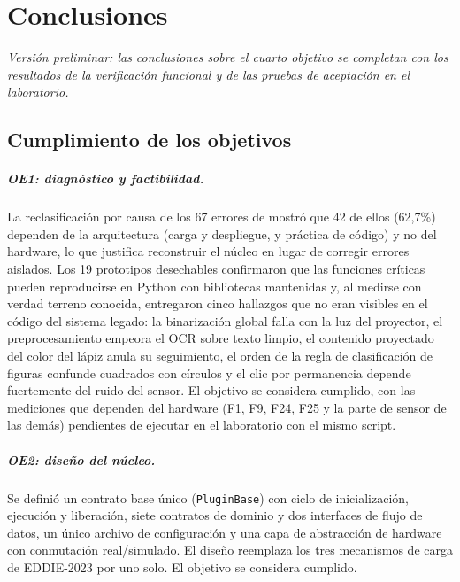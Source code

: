 \chapter{Conclusiones}
\label{cap:conclusiones}

\textit{Versión preliminar: las conclusiones sobre el cuarto objetivo se completan con los resultados de la verificación funcional y de las pruebas de aceptación en el laboratorio.}

\section{Cumplimiento de los objetivos}

\paragraph{OE1: diagnóstico y factibilidad.} La reclasificación por causa de los 67 errores de \citet{ibaceta2023} mostró que 42 de ellos (62,7\%) dependen de la arquitectura (carga y despliegue, y práctica de código) y no del hardware, lo que justifica reconstruir el núcleo en lugar de corregir errores aislados. Los 19 prototipos desechables confirmaron que las funciones críticas pueden reproducirse en Python con bibliotecas mantenidas y, al medirse con verdad terreno conocida, entregaron cinco hallazgos que no eran visibles en el código del sistema legado: la binarización global falla con la luz del proyector, el preprocesamiento empeora el OCR sobre texto limpio, el contenido proyectado del color del lápiz anula su seguimiento, el orden de la regla de clasificación de figuras confunde cuadrados con círculos y el clic por permanencia depende fuertemente del ruido del sensor. El objetivo se considera cumplido, con las mediciones que dependen del hardware (F1, F9, F24, F25 y la parte de sensor de las demás) pendientes de ejecutar en el laboratorio con el mismo script.

\paragraph{OE2: diseño del núcleo.} Se definió un contrato base único (\texttt{PluginBase}) con ciclo de inicialización, ejecución y liberación, siete contratos de dominio y dos interfaces de flujo de datos, un único archivo de configuración y una capa de abstracción de hardware con conmutación real/simulado. El diseño reemplaza los tres mecanismos de carga de EDDIE-2023 por uno solo. El objetivo se considera cumplido.


